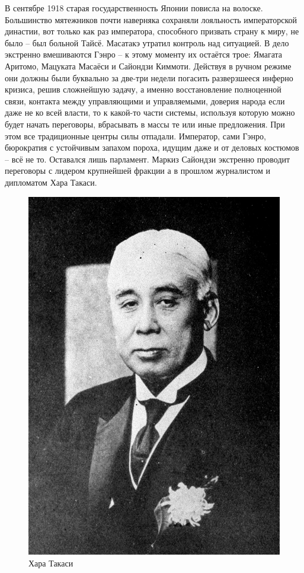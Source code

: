 В сентябре 1918 старая государственность Японии повисла на волоске. Большинство мятежников почти наверняка сохраняли лояльность императорской династии, вот только как раз императора, способного призвать страну к миру, не было – был больной Тайсё. Масатакэ утратил контроль над ситуацией. В дело экстренно вмешиваются Гэнро – к этому моменту их остаётся трое: Ямагата Аритомо, Мацуката Масаёси и Сайондзи Киммоти. Действуя в ручном режиме они должны были буквально за две-три недели погасить разверзшееся инферно кризиса, решив сложнейшую задачу, а именно восстановление полноценной связи, контакта между управляющими и управляемыми, доверия народа если даже не ко всей власти, то к какой-то части системы, используя которую можно будет начать переговоры, вбрасывать в массы те или иные предложения. При этом все традиционные центры силы отпадали. Император, сами Гэнро, бюрократия с устойчивым запахом пороха, идущим даже и от деловых костюмов – всё не то. Оставался лишь парламент. Маркиз Сайондзи экстренно проводит переговоры с лидером крупнейшей фракции а в прошлом журналистом и дипломатом Хара Такаси. 

\begin{figure}[h!tb] 
	\centering\includegraphics[scale=0.4]{Glava5/dY0QHkyaOvM.jpg}
	\caption{Хара Такаси}%
\end{figure}


